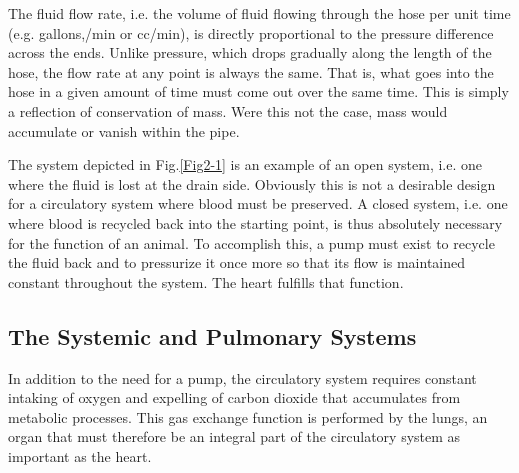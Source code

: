 The fluid flow rate, i.e. the volume of fluid flowing through the hose per unit time (e.g. gallons,/min or cc/min), is directly proportional to the pressure difference across the ends. Unlike pressure, which drops gradually along the length of the hose, the flow rate at any point is always the same. That is, what goes into the hose in a given amount of time must come out over the same time. This is simply a reflection of conservation of mass. Were this not the case, mass would accumulate or vanish within the pipe. 

The system depicted in Fig.\ref{Fig2-1} is an example of an open system, i.e. one where the fluid is lost at the drain side. Obviously this is not a desirable design for a circulatory system where blood must be preserved. A closed system, i.e. one where blood is recycled back into the starting point, is thus absolutely necessary for the function of an animal. To accomplish this, a pump must exist to recycle the fluid back and to pressurize it once more so that its flow is maintained constant throughout the system. The heart fulfills that function. 

\subsection{The Systemic and Pulmonary Systems}

In addition to the need for a pump, the circulatory system requires constant intaking of oxygen and expelling of carbon dioxide that accumulates from metabolic processes. This gas exchange function is performed by the lungs, an organ that must therefore be an integral part of the circulatory system as important as the heart. 

